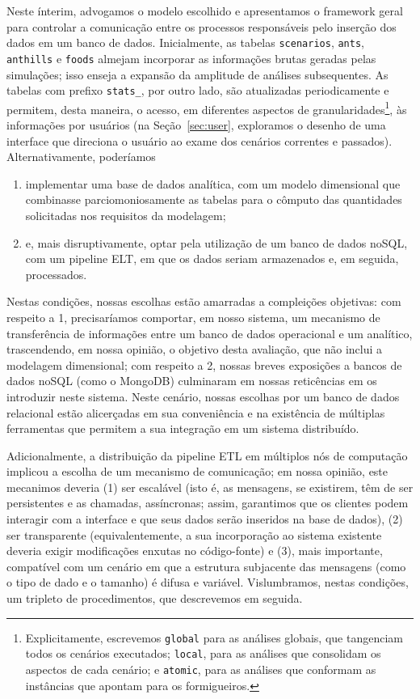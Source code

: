 \documentclass[12pt,oneside,a4paper]{article}
\begin{document}
	Neste ínterim, advogamos o modelo escolhido e apresentamos o framework geral para controlar a comunicação entre os processos responsáveis pelo inserção dos dados em um banco de dados. Inicialmente, as tabelas \texttt{scenarios}, \texttt{ants}, \texttt{anthills} e \texttt{foods} almejam incorporar as informações brutas geradas pelas simulações; isso enseja a expansão da amplitude de análises subsequentes. As tabelas com prefixo \texttt{stats\_}, por outro lado, são atualizadas periodicamente e permitem, desta maneira, o acesso, em diferentes aspectos de granularidades\footnote{Explicitamente, escrevemos \texttt{global} para as análises globais, que tangenciam todos os cenários executados; \texttt{local}, para as análises que consolidam os aspectos de cada cenário; e \texttt{atomic}, para as análises que conformam as instâncias que apontam para os formigueiros.}, às informações por usuários (na Seção~\ref{sec:user}, exploramos o desenho de uma interface que direciona o usuário ao exame dos cenários correntes e passados). Alternativamente, poderíamos 

	\begin{enumerate} 
		\item implementar uma base de dados analítica, com um modelo dimensional que combinasse parciomoniosamente as tabelas para o cômputo das quantidades solicitadas nos requisitos da modelagem;
		\item e, mais disruptivamente, optar pela utilização de um banco de dados noSQL, com um pipeline ELT, em que os dados seriam armazenados e, em seguida, processados. 
	\end{enumerate} 

	\noindent Nestas condições, nossas escolhas estão amarradas a compleições objetivas: com respeito a 1, precisaríamos comportar, em nosso sistema, um mecanismo de transferência de informações entre um banco de dados operacional e um analítico, trascendendo, em nossa opinião, o objetivo desta avaliação, que não inclui a modelagem dimensional; com respeito a 2, nossas breves exposições a bancos de dados noSQL (como o MongoDB) culminaram em nossas reticências em os introduzir neste sistema. Neste cenário, nossas escolhas por um banco de dados relacional estão alicerçadas em sua conveniência e na existência de múltiplas ferramentas que permitem a sua integração em um sistema distribuído. 

	Adicionalmente, a distribuição da pipeline ETL em múltiplos nós de computação implicou a escolha de um mecanismo de comunicação; em nossa opinião, este mecanimos deveria (1) ser escalável (isto é, as mensagens, se existirem, têm de ser persistentes e as chamadas, assíncronas; assim, garantimos que os clientes podem interagir com a interface e que seus dados serão inseridos na base de dados), (2) ser transparente (equivalentemente, a sua incorporação ao sistema existente deveria exigir modificações enxutas no código-fonte) e (3), mais importante, compatível com um cenário em que a estrutura subjacente das mensagens (como o tipo de dado e o tamanho) é difusa e variável. Vislumbramos, nestas condições, um tripleto de procedimentos, que descrevemos em seguida.
\end{document}
